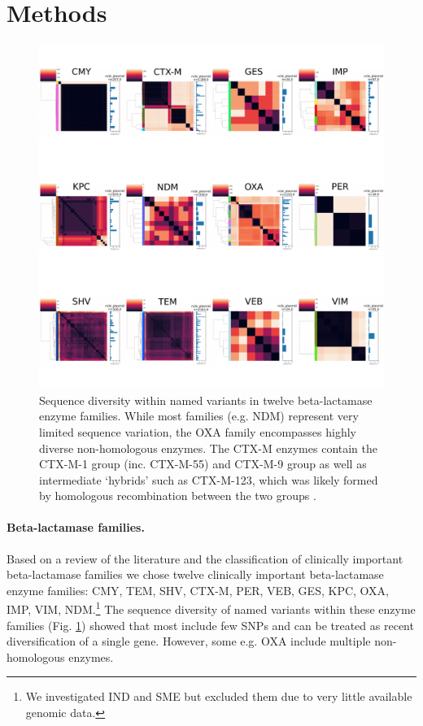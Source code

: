 \documentclass[aps,rmp,preprint,superscriptaddress,10pt,twocolumn]{revtex4-1}
\begin{document}
\section{Methods}

\begin{figure}
    \centering
    \includegraphics[width=\linewidth]{figs/COMBINED_ncbi_plasmid.pdf}
    \caption{Sequence diversity within named variants in twelve beta-lactamase enzyme families. While most families (e.g. NDM) represent very limited sequence variation, the OXA family encompasses highly diverse non-homologous enzymes. The CTX-M enzymes contain the CTX-M-1 group (inc. CTX-M-55) and CTX-M-9 group as well as intermediate `hybrids' such as CTX-M-123, which was likely formed by homologous recombination between the two groups \cite{He2013}.}
    \label{fig:family-alignments-plasmid}
\end{figure}

\paragraph*{Beta-lactamase families.} Based on a review of the literature and the classification of clinically important beta-lactamase families \cite{Bush2010} we chose twelve clinically important beta-lactamase enzyme families: CMY, TEM, SHV, CTX-M, PER, VEB, GES, KPC, OXA, IMP, VIM, NDM.\footnote{We investigated IND and SME but excluded them due to very little available genomic data.} The sequence diversity of named variants within these enzyme families (Fig. \ref{fig:family-alignments-plasmid}) showed that most include few SNPs and can be treated as recent diversification of a single gene. However, some e.g. OXA include multiple non-homologous enzymes. 
\end{document}
